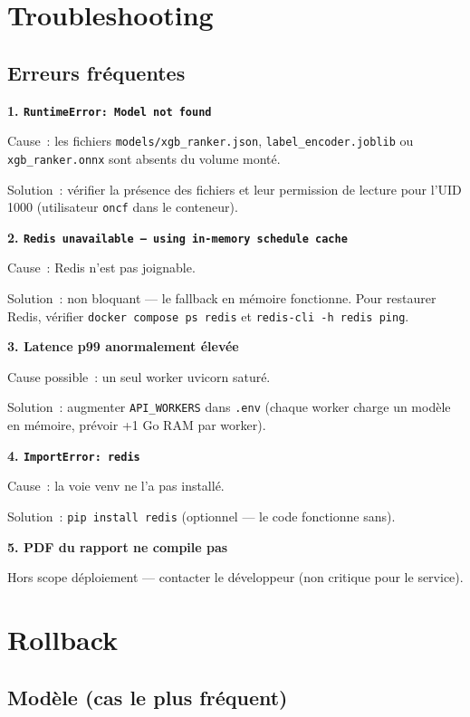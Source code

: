 \documentclass[11pt, a4paper]{article}
\begin{document}
\section{Troubleshooting}

\subsection{Erreurs fréquentes}

\textbf{1. \texttt{RuntimeError: Model not found}}

Cause~: les fichiers \texttt{models/xgb\_ranker.json},
\texttt{label\_encoder.joblib} ou \texttt{xgb\_ranker.onnx} sont absents
du volume monté.

Solution~: vérifier la présence des fichiers et leur permission de
lecture pour l'UID 1000 (utilisateur \texttt{oncf} dans le conteneur).

\textbf{2. \texttt{Redis unavailable --- using in-memory schedule cache}}

Cause~: Redis n'est pas joignable.

Solution~: non bloquant --- le fallback en mémoire fonctionne. Pour
restaurer Redis, vérifier \texttt{docker compose ps redis} et
\texttt{redis-cli -h redis ping}.

\textbf{3. Latence p99 anormalement élevée}

Cause possible~: un seul worker uvicorn saturé.

Solution~: augmenter \texttt{API\_WORKERS} dans \texttt{.env} (chaque
worker charge un modèle en mémoire, prévoir +1 Go RAM par worker).

\textbf{4. \texttt{ImportError: redis}}

Cause~: la voie venv ne l'a pas installé.

Solution~: \texttt{pip install redis} (optionnel --- le code fonctionne
sans).

\textbf{5. PDF du rapport ne compile pas}

Hors scope déploiement --- contacter le développeur (non critique pour
le service).

\section{Rollback}

\subsection{Modèle (cas le plus fréquent)}
\end{document}
